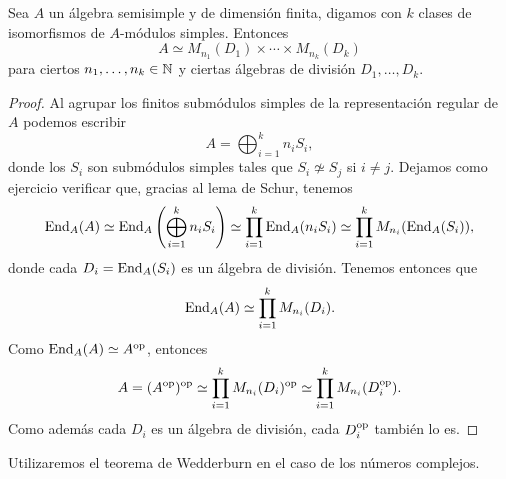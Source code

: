 
\begin{theorem}
Sea $A$ un álgebra semisimple y de dimensión finita, digamos con 
$k$ clases de isomorfismos de $A$-módulos simples. Entonces 
\[
A\simeq M_{n_1}(D_1)\times\cdots\times M_{n_k}(D_k)
\]
para ciertos $n_1,\dots,n_k\in\mathbb{N}$ y ciertas álgebras de división $D_1,\dots,D_k$.
\end{theorem}

\begin{proof}
	Al agrupar los finitos
	submódulos simples de la representación regular de $A$ podemos escribir 
	\[
	A=\bigoplus_{i=1}^k n_iS_i,
	\]
	donde los $S_i$ son submódulos simples tales que $S_i\not\simeq S_j$ si
	$i\ne j$. Dejamos como ejercicio verificar que, gracias al lema de Schur, tenemos 
	\begin{align*}
		\operatorname{End}_A(A)\simeq\operatorname{End}_A\left(\bigoplus_{i=1}^kn_iS_i\right)
		\simeq \prod_{i=1}^k\operatorname{End}_A(n_iS_i)
		\simeq\prod_{i=1}^kM_{n_i}(\operatorname{End}_A(S_i)), 
	\end{align*}
	donde cada $D_i=\operatorname{End}_A(S_i)$ es un álgebra de división. 
	Tenemos entonces que %
	\[
		\operatorname{End}_A(A)\simeq\prod_{i=1}^kM_{n_i}(D_i).
	\]
	Como $\operatorname{End}_A(A)\simeq
	A^{\operatorname{op}}$, entonces 
	\begin{align*}
		A=(A^{\operatorname{op}})^{\operatorname{op}}\simeq \prod_{i=1}^kM_{n_i}(D_i)^{\operatorname{op}}\simeq \prod_{i=1}^kM_{n_i}(D_i^{\operatorname{op}}).
	\end{align*}
	Como además 
	cada $D_i$ es un álgebra de división, cada $D_i^{\operatorname{op}}$ también lo es.
\end{proof}

Utilizaremos el teorema de Wedderburn en el caso de los números complejos. 
%

